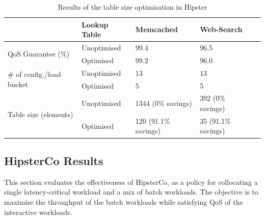 \begin{table}[t]
\centering
{}
\setlength{\tabcolsep}{5pt}

    \caption{Results of the table size optimisation in Hipster} 
    \begin{tabular}{@{}llllr@{}}
        \toprule
                                                            &  Lookup Table           & Memcached	         & Web-Search  \\
        \midrule
        \multirow{2}{*}{QoS Guarantee (\%)}                 & Unoptimised    & 99.4                 & 96.5 \\
                                                            & Optimised      & 99.2                 & 96.0 \\
        \multirow{2}{*}{\# of config./load bucket}          & Unoptimised    & 13                   & 13  \\
                                                            & Optimised      & 5                    & 5 \\
        \multirow{2}{*}{Table size (elements)}              & Unoptimised    & 1344 (0\% savings)         & 392 (0\% savings) \\
                                                            & Optimised      & 120  (91.1\% savings)         & 35 (91.1\% savings)\\
                                                            
        \bottomrule
    \end{tabular}    
    \label{fig:sizehipster} 
\end{table}


\subsection{HipsterCo Results}
\label{subsec: coalloc}

 This section evaluates the effectiveness of HipsterCo, as a policy for
collocating a single latency-critical workload and a mix of batch workloads.  The
objective is to maximise the throughput of the batch workloads while satisfying QoS of the
interactive workloads.

